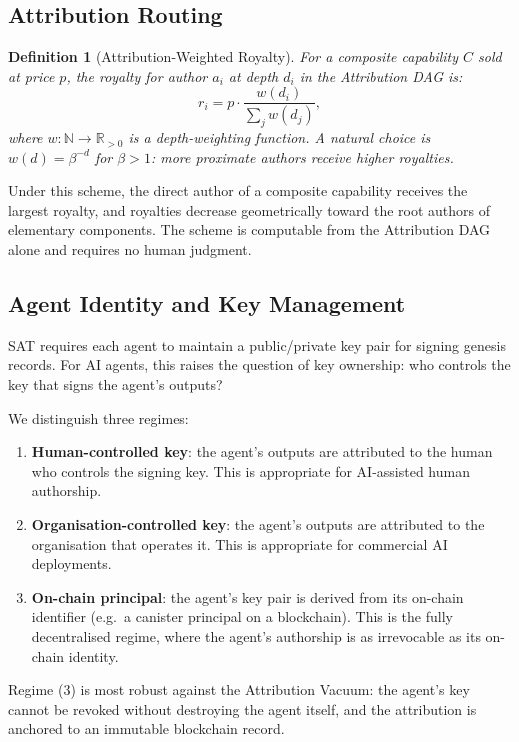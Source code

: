 \documentclass[12pt]{article}
\newtheorem{definition}[theorem]{Definition}
\begin{document}
\subsection{Attribution Routing}

\begin{definition}[Attribution-Weighted Royalty]
  For a composite capability $C$ sold at price $p$, the royalty for author $a_i$
  at depth $d_i$ in the Attribution DAG is:
  \[
    r_i = p \cdot \frac{w(d_i)}{\sum_j w(d_j)},
  \]
  where $w : \mathbb{N} \to \mathbb{R}_{>0}$ is a depth-weighting function.
  A natural choice is $w(d) = \beta^{-d}$ for $\beta > 1$: more proximate
  authors receive higher royalties.
\end{definition}

Under this scheme, the direct author of a composite capability receives the
largest royalty, and royalties decrease geometrically toward the root authors
of elementary components.  The scheme is computable from the Attribution DAG
alone and requires no human judgment.

\subsection{Agent Identity and Key Management}

SAT requires each agent to maintain a public/private key pair for signing
genesis records.  For AI agents, this raises the question of key ownership: who
controls the key that signs the agent's outputs?

We distinguish three regimes:
\begin{enumerate}[label=(\arabic*)]
  \item \textbf{Human-controlled key}: the agent's outputs are attributed to the
    human who controls the signing key.  This is appropriate for AI-assisted
    human authorship.
  \item \textbf{Organisation-controlled key}: the agent's outputs are attributed
    to the organisation that operates it.  This is appropriate for commercial
    AI deployments.
  \item \textbf{On-chain principal}: the agent's key pair is derived from its
    on-chain identifier (e.g.\ a canister principal on a blockchain).  This is
    the fully decentralised regime, where the agent's authorship is as
    irrevocable as its on-chain identity.
\end{enumerate}

Regime (3) is most robust against the Attribution Vacuum: the agent's key
cannot be revoked without destroying the agent itself, and the attribution is
anchored to an immutable blockchain record.
\end{document}
